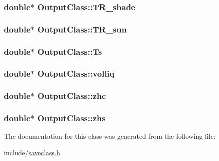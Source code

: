 \subsubsection[{\texorpdfstring{T\+R\+\_\+shade}{TR_shade}}]{\setlength{\rightskip}{0pt plus 5cm}double$\ast$ Output\+Class\+::\+T\+R\+\_\+shade}\hypertarget{class_output_class_a1f8231b7cfaf652fcb8bc7c86a98f4f3}{}\label{class_output_class_a1f8231b7cfaf652fcb8bc7c86a98f4f3}
\subsubsection[{\texorpdfstring{T\+R\+\_\+sun}{TR_sun}}]{\setlength{\rightskip}{0pt plus 5cm}double$\ast$ Output\+Class\+::\+T\+R\+\_\+sun}\hypertarget{class_output_class_aa44eeab755cc348902d9b4aa04d82cb1}{}\label{class_output_class_aa44eeab755cc348902d9b4aa04d82cb1}
\subsubsection[{\texorpdfstring{Ts}{Ts}}]{\setlength{\rightskip}{0pt plus 5cm}double$\ast$ Output\+Class\+::\+Ts}\hypertarget{class_output_class_a0bd5c93eb11796d9ad1a67010656363b}{}\label{class_output_class_a0bd5c93eb11796d9ad1a67010656363b}
\subsubsection[{\texorpdfstring{volliq}{volliq}}]{\setlength{\rightskip}{0pt plus 5cm}double$\ast$ Output\+Class\+::volliq}\hypertarget{class_output_class_ac3649d135f6f2db24caee7036f18e6b3}{}\label{class_output_class_ac3649d135f6f2db24caee7036f18e6b3}
\subsubsection[{\texorpdfstring{zhc}{zhc}}]{\setlength{\rightskip}{0pt plus 5cm}double$\ast$ Output\+Class\+::zhc}\hypertarget{class_output_class_ac0f6ae6bd67a1bf4c917e0a59e64fe0f}{}\label{class_output_class_ac0f6ae6bd67a1bf4c917e0a59e64fe0f}
\subsubsection[{\texorpdfstring{zhs}{zhs}}]{\setlength{\rightskip}{0pt plus 5cm}double$\ast$ Output\+Class\+::zhs}\hypertarget{class_output_class_a6f9e4e0e887070e678b95a58fd278ef8}{}\label{class_output_class_a6f9e4e0e887070e678b95a58fd278ef8}


The documentation for this class was generated from the following file\+:\begin{DoxyCompactItemize}
\item 
include/\hyperlink{saveclass_8h}{saveclass.\+h}\end{DoxyCompactItemize}
